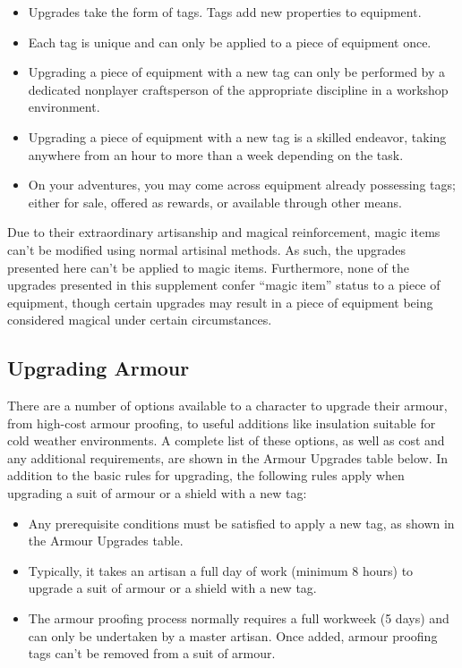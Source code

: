 \documentclass{book}
\providecommand{\tightlist}{%
\setlength{\itemsep}{0pt}\setlength{\parskip}{0pt}}
\begin{document}
\begin{itemize}
\tightlist
\item
  Upgrades take the form of tags. Tags add new properties to equipment.
\item
  Each tag is unique and can only be applied to a piece of equipment
  once.
\item
  Upgrading a piece of equipment with a new tag can only be performed by
  a dedicated nonplayer craftsperson of the appropriate discipline in a
  workshop environment.
\item
  Upgrading a piece of equipment with a new tag is a skilled endeavor,
  taking anywhere from an hour to more than a week depending on the
  task.
\item
  On your adventures, you may come across equipment already possessing
  tags; either for sale, offered as rewards, or available through other
  means.
\end{itemize}

Due to their extraordinary artisanship and magical reinforcement, magic
items can't be modified using normal artisinal methods. As such, the
upgrades presented here can't be applied to magic items. Furthermore,
none of the upgrades presented in this supplement confer ``magic item''
status to a piece of equipment, though certain upgrades may result in a
piece of equipment being considered magical under certain circumstances.



\subsection*{Upgrading Armour}\label{upgrading-armour}

There are a number of options available to a character to upgrade their
armour, from high-cost armour proofing, to useful additions like
insulation suitable for cold weather environments. A complete list of
these options, as well as cost and any additional requirements, are
shown in the Armour Upgrades table below. In addition to the basic rules
for upgrading, the following rules apply when upgrading a suit of armour
or a shield with a new tag:

\begin{itemize}
\tightlist
\item
  Any prerequisite conditions must be satisfied to apply a new tag, as
  shown in the Armour Upgrades table.
\item
  Typically, it takes an artisan a full day of work (minimum 8 hours) to
  upgrade a suit of armour or a shield with a new tag.
\item
  The armour proofing process normally requires a full workweek (5 days)
  and can only be undertaken by a master artisan. Once added, armour
  proofing tags can't be removed from a suit of armour.
\end{itemize}
\end{document}
